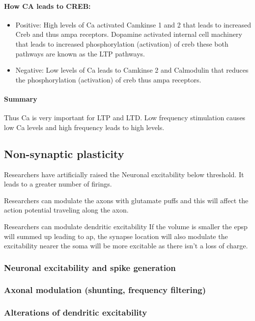 \documentclass[main]{subfiles}
\begin{document}
\paragraph{How CA leads to CREB:}
\begin{itemize}
    \item Positive: High levels of Ca activated Camkinse 1 and 2 that leads to increased Creb and thus ampa receptors. Dopamine activated internal cell machinery that leads to increased phosphorylation (activation) of creb these both pathways are known as the LTP pathways. 
    \item Negative: Low levels of Ca leads to Camkinse 2 and Calmodulin that reduces the phosphorylation (activation) of creb thus ampa receptors.
\end{itemize}

\paragraph{Summary}
Thus Ca is very important for LTP and LTD. Low frequency stimulation causes low Ca levels and high frequency leads to high levels.

\subsection{Non-synaptic plasticity}
Researchers have artificially raised the Neuronal excitability below threshold. It leads to a greater number of firings. 

Researchers can modulate the axons with glutamate puffs and this will affect the action potential traveling along the axon. 

Researchers can modulate dendritic excitability 
If the volume is smaller the epsp will summed up leading to ap, the synapse location will also modulate the excitability nearer the soma will be more excitable as there isn’t a loss of charge.

\subsubsection{Neuronal excitability and spike generation}
\subsubsection{Axonal modulation (shunting, frequency filtering)}
\subsubsection{Alterations of dendritic excitability}
\end{document}
